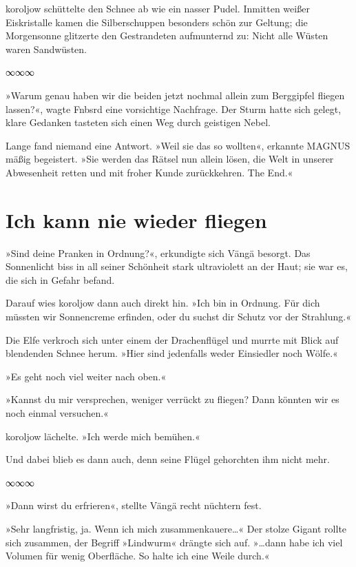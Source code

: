 koroljow schüttelte den Schnee ab wie ein nasser Pudel. Inmitten weißer Eiskristalle kamen die Silberschuppen besonders schön zur Geltung; die Morgensonne glitzerte den Gestrandeten aufmunternd zu: Nicht alle Wüsten waren Sandwüsten.

\begin{center}
∞∞∞
\end{center}

»Warum genau haben wir die beiden jetzt nochmal allein zum Berggipfel fliegen lassen?«, wagte Fnbsrd eine vorsichtige Nachfrage. Der Sturm hatte sich gelegt, klare Gedanken tasteten sich einen Weg durch geistigen Nebel.

Lange fand niemand eine Antwort. »Weil sie das so wollten«, erkannte MAGNUS mäßig begeistert. »Sie werden das Rätsel nun allein lösen, die Welt in unserer Abwesenheit retten und mit froher Kunde zurückkehren. The End.«


\chapter{Ich kann nie wieder fliegen}

»Sind deine Pranken in Ordnung?«, erkundigte sich Vängä besorgt. Das Sonnenlicht biss in all seiner Schönheit stark ultraviolett an der Haut; sie war es, die sich in Gefahr befand.

Darauf wies koroljow dann auch direkt hin. »Ich bin in Ordnung. Für dich müssten wir Sonnencreme erfinden, oder du suchst dir Schutz vor der Strahlung.«

Die Elfe verkroch sich unter einem der Drachenflügel und murrte mit Blick auf blendenden Schnee herum. »Hier sind jedenfalls weder Einsiedler noch Wölfe.«

»Es geht noch viel weiter nach oben.«

»Kannst du mir versprechen, weniger verrückt zu fliegen? Dann könnten wir es noch einmal versuchen.«

koroljow lächelte. »Ich werde mich bemühen.«

Und dabei blieb es dann auch, denn seine Flügel gehorchten ihm nicht mehr.

\begin{center}
∞∞∞
\end{center}

»Dann wirst du erfrieren«, stellte Vängä recht nüchtern fest.

»Sehr langfristig, ja. Wenn ich mich zusammenkauere…« Der stolze Gigant rollte sich zusammen, der Begriff »Lindwurm« drängte sich auf. »…dann habe ich viel Volumen für wenig Oberfläche. So halte ich eine Weile durch.«

